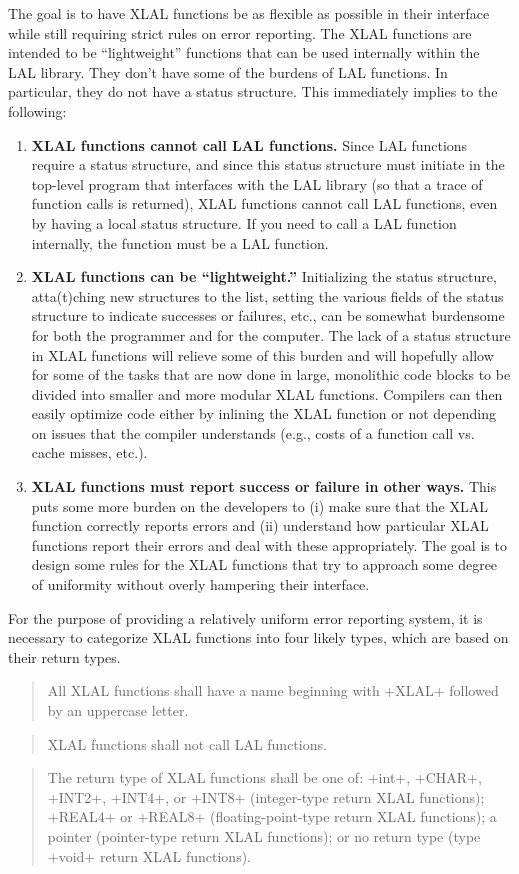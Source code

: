 \documentclass[10pt]{ligodcc}
\makeatletter
\def\verb{\relax\ifmmode\hbox\else\leavevmode\null\fi
  \bgroup
    \color{blue}\small
    \verb@eol@error \let\do\@makeother \dospecials
    \verbatim@font\@noligs
    \@ifstar\@sverb\@verb}
\newlength{\fminilength}
\newenvironment{fminipage}[1][\linewidth]
  {\setlength{\fminilength}{#1-2\fboxsep-2\fboxrule}%
   \begin{lrbox}{\fminibox}\begin{minipage}{\fminilength}}
  {\end{minipage}\end{lrbox}\noindent\fbox{\usebox{\fminibox}}}
\newenvironment{lalrule}{\begin{quote}\color{red}\begin{fminipage}}
  {\end{fminipage}\end{quote}}
\makeatother
\begin{document}
The goal is to have XLAL functions be as flexible as possible in their
interface while still requiring strict rules on error reporting.  The
XLAL functions are intended to be ``lightweight'' functions that can
be used internally within the LAL library.  They don't have some of the
burdens of LAL functions.  In particular, they do not have a status structure.
This immediately implies to the following:
\begin{enumerate}
\item \textbf{XLAL functions cannot call LAL functions.}  Since LAL functions
require a status structure, and since this status structure must initiate in
the top-level program that interfaces with the LAL library (so that a trace of
function calls is returned), XLAL functions cannot call LAL functions, even
by having a local status structure.  If you need to call a LAL function
internally, the function must be a LAL function.
\item \textbf{XLAL functions can be ``lightweight.''}  Initializing the status
structure, atta(t)ching new structures to the list, setting the various fields
of the status structure to indicate successes or failures, etc., can be
somewhat burdensome for both the programmer and for the computer.  The lack
of a status structure in XLAL functions will relieve some of this burden and
will hopefully allow for some of the tasks that are now done in large,
monolithic code blocks to be divided into smaller and more modular XLAL
functions.  Compilers can then easily optimize code either by inlining the
XLAL function or not depending on issues that the compiler understands
(e.g., costs of a function call vs. cache misses, etc.).
\item \textbf{XLAL functions must report success or failure in other ways.}
This puts some more burden on the developers to (i) make sure that the XLAL
function correctly reports errors and (ii) understand how particular XLAL
functions report their errors and deal with these appropriately.  The goal
is to design some rules for the XLAL functions that try to approach some
degree of uniformity without overly hampering their interface.
\end{enumerate}
For the purpose of providing a relatively uniform error reporting system, it
is necessary to categorize XLAL functions into four likely types, which are
based on their return types.
\begin{lalrule}
All XLAL functions shall have a name beginning with \verb+XLAL+ followed by
an uppercase letter.
\end{lalrule}
\begin{lalrule}
XLAL functions shall not call LAL functions.
\end{lalrule}
\begin{lalrule}
The return type of XLAL functions shall be one of:
\verb+int+, \verb+CHAR+, \verb+INT2+, \verb+INT4+, or \verb+INT8+ (integer-type
return XLAL functions); \verb+REAL4+ or \verb+REAL8+ (floating-point-type
return XLAL functions); a pointer (pointer-type return XLAL functions);
or no return type (type \verb+void+ return XLAL functions).
\end{lalrule}
\end{document}
